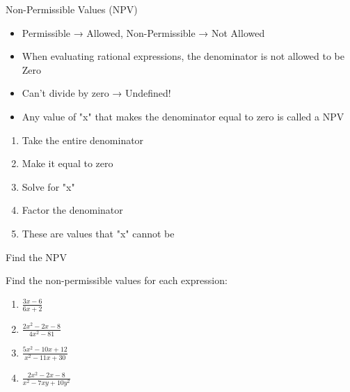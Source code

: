 \documentclass[aspectratio=169]{beamer}
\begin{document}
\begin{frame}{Non-Permissible Values (NPV)}
\begin{tcolorbox}[colback=lightgray,colframe=primary,title=Definition]
\footnotesize
\begin{itemize}
  \item Permissible → Allowed, Non-Permissible → Not Allowed
  \item When evaluating rational expressions, the denominator is not allowed to be Zero
  \item Can't divide by zero → Undefined!
  \item Any value of "x" that makes the denominator equal to zero is called a NPV
\end{itemize}
\end{tcolorbox}

\begin{tcolorbox}[colback=lightgray,colframe=secondary,title=Steps to Find NPV]
\footnotesize
\begin{enumerate}
  \item Take the entire denominator
  \item Make it equal to zero
  \item Solve for "x"
  \item Factor the denominator
  \item These are values that "x" cannot be
\end{enumerate}
\end{tcolorbox}
\end{frame}

\begin{frame}{Find the NPV}
\begin{tcolorbox}[colback=lightgray,colframe=primary,title=Practice]
\footnotesize
Find the non-permissible values for each expression:
\begin{enumerate}
  \item $\frac{3x - 6}{6x + 2}$
  \item $\frac{2x^2 - 2x - 8}{4x^2 - 81}$
  \item $\frac{5x^2 - 10x + 12}{x^2 - 11x + 30}$
  \item $\frac{2x^2 - 2x - 8}{x^2 - 7xy + 10y^2}$
\end{enumerate}
\end{tcolorbox}
\end{frame}
\end{document}
